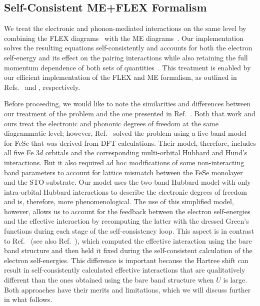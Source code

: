 \documentclass[%
 reprint,
 superscriptaddress,
nofootinbib,
nobibnotes,
 amsmath,amssymb,
 aps,
 prb,
 dvipsnames, 
 floatfix
]{revtex4-2}
\begin{document}
\subsection{Self-Consistent ME+FLEX Formalism}
We treat the electronic and phonon-mediated interactions on the same level by combining the FLEX diagrams~\cite{Bickers:1989hu, Linscheid2016, Nocera2018} with the ME diagrams~\cite{Rademaker2016,WangSUST}. Our implementation solves the resulting equations self-consistently and accounts for both the electron self-energy and its effect on the pairing interactions while also retaining the full momentum dependence of both sets of quantities~\cite{Nocera2018}. This treatment is enabled by our efficient implementation of the FLEX and ME formalism, as outlined in Refs.~\cite{Nocera2018} and \cite{DeePRB2019}, respectively. 

Before proceeding, we would like to note the similarities and differences between our treatment of the problem and the one presented in Ref.~\cite{Schrodi:2020bq}.   
Both that work and ours treat the electronic and phononic degrees of freedom at the same diagrammatic level; however, Ref.~\cite{Schrodi:2020bq} solved the problem using a five-band model for FeSe that was derived from DFT calculations. Their model, therefore, includes all five Fe $3d$ orbitals and the corresponding multi-orbital Hubbard and Hund's interactions. But it also required ad hoc modifications of some non-interacting band parameters to account for lattice 
mismatch between the FeSe monolayer and the STO substrate. Our model uses the two-band Hubbard model with only intra-orbital Hubbard interactions to describe the electronic degrees of freedom and is, therefore, more phenomenological. The use of this simplified model, however, allows us to account for the feedback between the electron self-energies and the effective interaction by recomputing the latter with the dressed Green's functions during each stage of the self-consistency loop. This aspect is in contrast to Ref.~\cite{Schrodi:2020bq} (see also Ref.~\cite{Schrodi:2020bz}), which computed the effective interaction using the bare band structure and then held it fixed during the self-consistent calculation of the electron self-energies. This difference is important because the Hartree shift can result in self-consistently calculated effective interactions that are qualitatively different than the ones obtained using the bare band structure when $U$ is large. Both approaches have their merits and limitations, which we will discuss further in what follows.
\end{document}
